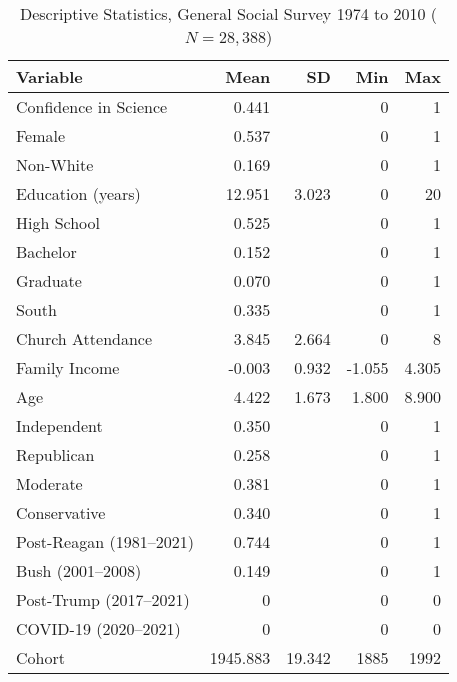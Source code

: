 \begin{table}[ht]
\centering
\begin{tabularx}{\textwidth}{Xrrrr}
\caption{Descriptive Statistics, General Social Survey 1974 to 2010 ($N=28,388$)} 
\label{table:GssStats2010} \\
  \toprule
Variable & Mean & SD & Min & Max \\ 
  \midrule
Confidence in Science & 0.441 &  & 0 & 1 \\ 
  Female & 0.537 &  & 0 & 1 \\ 
  Non-White & 0.169 &  & 0 & 1 \\ 
  Education (years) & 12.951 & 3.023 & 0 & 20 \\ 
  High School & 0.525 &  & 0 & 1 \\ 
  Bachelor & 0.152 &  & 0 & 1 \\ 
  Graduate & 0.070 &  & 0 & 1 \\ 
  South & 0.335 &  & 0 & 1 \\ 
  Church Attendance & 3.845 & 2.664 & 0 & 8 \\ 
  Family Income & -0.003 & 0.932 & -1.055 & 4.305 \\ 
  Age & 4.422 & 1.673 & 1.800 & 8.900 \\ 
  Independent & 0.350 &  & 0 & 1 \\ 
  Republican & 0.258 &  & 0 & 1 \\ 
  Moderate & 0.381 &  & 0 & 1 \\ 
  Conservative & 0.340 &  & 0 & 1 \\ 
  Post-Reagan (1981--2021) & 0.744 &  & 0 & 1 \\ 
  Bush (2001--2008) & 0.149 &  & 0 & 1 \\ 
  Post-Trump (2017--2021) & 0 &  & 0 & 0 \\ 
  COVID-19 (2020--2021) & 0 &  & 0 & 0 \\ 
  Cohort & 1945.883 & 19.342 & 1885 & 1992 \\ 
   \bottomrule
\end{tabularx}
\end{table}
